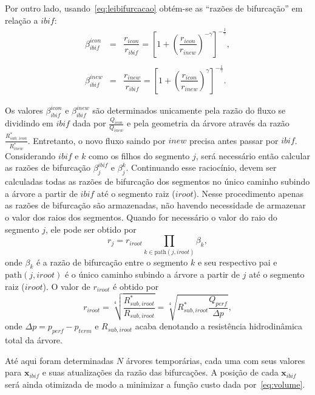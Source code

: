 Por outro lado, usando~\eqref{eq:leibifurcacao} obtém-se as ``razões de bifurcação''
em relação a $ibif$:
\begin{eqnarray}
  \beta_{ibif}^{icon} &=& \dfrac{r_{icon}}{r_{ibif}} = \left[1 + \left(\dfrac{r_{icon}}{r_{inew}}\right)^{-\gamma}\right]^{-\frac{1}{\gamma}}, \label{eq:razao.bifurcacao.ibif.icon} \\ 
  & & \nonumber\\
  \beta_{ibif}^{inew} &=& \dfrac{r_{inew}}{r_{ibif}} = \left[1 + \left(\dfrac{r_{icon}}{r_{inew}}\right)^{\gamma}\right]^{-\frac{1}{\gamma}}. \label{eq:razao.bifurcacao.ibif.inew}
\end{eqnarray}

Os valores $\beta_{ibif}^{icon}$ e $\beta_{ibif}^{inew}$ são determinados 
unicamente pela razão do fluxo se dividindo em $ibif$ dada por $\frac{Q_{icon}}{Q_{inew}}$
e pela geometria da árvore através da razão $\frac{R^*_{sub,\,icon}}{R^*_{inew}}$.
Entretanto, o novo fluxo saindo por $inew$ precisa antes passar por 
$ibif$. Considerando $ibif$ e $k$ como os filhos do segmento $j$, será 
necessário então calcular as razões de bifurcação $\beta_{j}^{ibif}$ e $\beta_{j}^{k}$.
Continuando esse raciocínio, devem ser calculadas todas as razões de bifurcação dos 
segmentos no único caminho subindo a árvore a partir de $ibif$ até o segmento 
raiz ($iroot$). Nesse procedimento apenas as razões de bifurcação são armazenadas, 
não havendo necessidade de armazenar o valor dos raios dos segmentos. 
Quando for necessário o valor do raio do segmento $j$, ele pode ser obtido por
\begin{equation}
 r_j = r_{iroot} \prod_{k \in \textrm{path}(j, iroot)} \beta_{k},
 \label{eq:raio.segmento.j}
\end{equation}
onde $\beta_{k}$ é a razão de bifurcação entre o segmento $k$ e seu respectivo pai e 
$\textrm{path}(j, iroot)$ é o único caminho subindo a árvore a partir de $j$ até 
o segmento raiz ($iroot$). O valor de $r_{iroot}$ é obtido por
\begin{equation}
 r_{iroot} = \sqrt[4]{\dfrac{R^{*}_{sub,iroot}}{R_{sub,iroot}}} = \sqrt[4]{R^{*}_{sub,iroot}\dfrac{Q_{perf}}{\Delta p}},
 \label{eq:raio.iroot}
\end{equation}
onde $\Delta p = p_{perf} - p_{term}$ e $R_{sub,iroot}$ acaba denotando a resistência hidrodinâmica total da árvore.

Até aqui foram determinadas $N$ árvores temporárias, cada uma com seus valores 
para $\mathbf{x}_{ibif}$ e suas atualizações da razão das bifurcações. A posição de 
cada $\mathbf{x}_{ibif}$ será ainda otimizada de modo a minimizar a função custo 
dada por~\eqref{eq:volume}.

